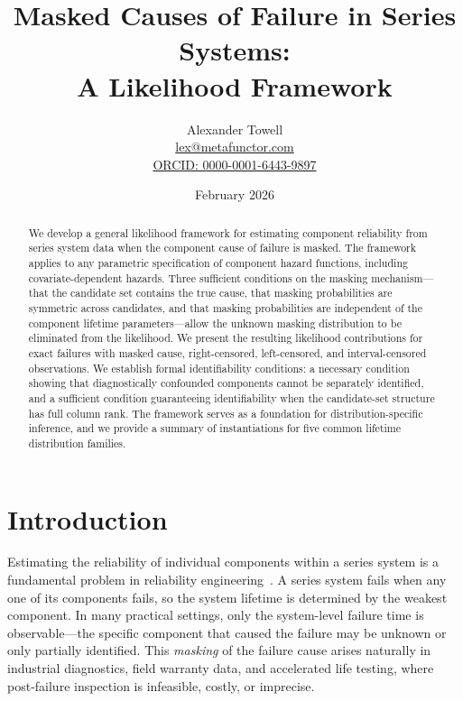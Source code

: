 \documentclass[11pt]{article}
\title{Masked Causes of Failure in Series Systems:\\
A Likelihood Framework}
\author{
    Alexander Towell\\
    \href{mailto:lex@metafunctor.com}{lex@metafunctor.com}\\
    \href{https://orcid.org/0000-0001-6443-9897}{ORCID: 0000-0001-6443-9897}
}
\date{February 2026}
\theoremstyle{definition}
\theoremstyle{plain}
\begin{document}
\maketitle

\begin{abstract}
We develop a general likelihood framework for estimating component reliability
from series system data when the component cause of failure is masked.
The framework applies to any parametric specification of component hazard
functions, including covariate-dependent hazards.
Three sufficient conditions on the masking mechanism---that the candidate set
contains the true cause, that masking probabilities are symmetric across
candidates, and that masking probabilities are independent of the component
lifetime parameters---allow the unknown masking distribution to be eliminated
from the likelihood.
We present the resulting likelihood contributions for exact failures with
masked cause, right-censored, left-censored, and interval-censored observations.
We establish formal identifiability conditions: a necessary condition showing
that diagnostically confounded components cannot be separately identified,
and a sufficient condition guaranteeing identifiability when the
candidate-set structure has full column rank.
The framework serves as a foundation for distribution-specific inference,
and we provide a summary of instantiations for five common lifetime distribution
families.
\end{abstract}

\section{Introduction}
\label{sec:introduction}

Estimating the reliability of individual components within a series system
is a fundamental problem in reliability engineering~\citep{Agustin-2011}.
A series system fails when any one of its components fails, so the system
lifetime is determined by the weakest component.
In many practical settings, only the system-level failure time is
observable---the specific component that caused the failure may be unknown
or only partially identified.
This \emph{masking} of the failure cause arises naturally in industrial
diagnostics, field warranty data, and accelerated life testing, where
post-failure inspection is infeasible, costly, or imprecise.
\end{document}
